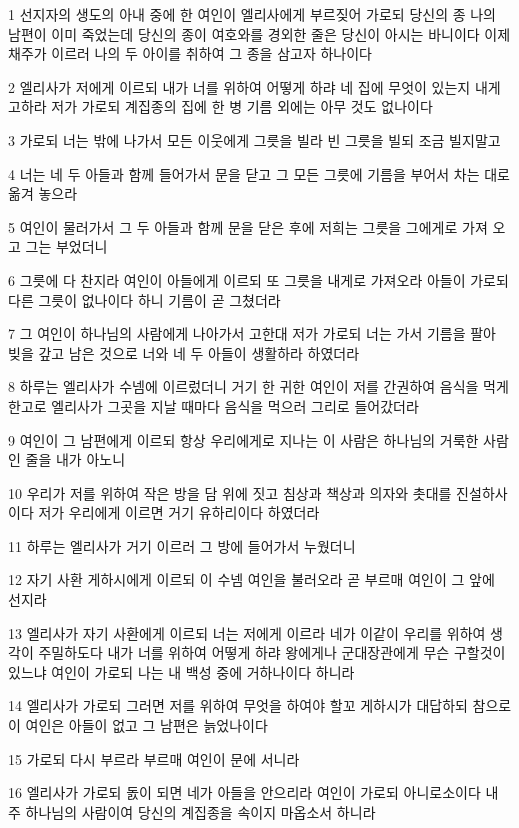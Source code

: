 \par 1 선지자의 생도의 아내 중에 한 여인이 엘리사에게 부르짖어 가로되 당신의 종 나의 남편이 이미 죽었는데 당신의 종이 여호와를 경외한 줄은 당신이 아시는 바니이다 이제 채주가 이르러 나의 두 아이를 취하여 그 종을 삼고자 하나이다
\par 2 엘리사가 저에게 이르되 내가 너를 위하여 어떻게 하랴 네 집에 무엇이 있는지 내게 고하라 저가 가로되 계집종의 집에 한 병 기름 외에는 아무 것도 없나이다
\par 3 가로되 너는 밖에 나가서 모든 이웃에게 그릇을 빌라 빈 그릇을 빌되 조금 빌지말고
\par 4 너는 네 두 아들과 함께 들어가서 문을 닫고 그 모든 그릇에 기름을 부어서 차는 대로 옮겨 놓으라
\par 5 여인이 물러가서 그 두 아들과 함께 문을 닫은 후에 저희는 그릇을 그에게로 가져 오고 그는 부었더니
\par 6 그릇에 다 찬지라 여인이 아들에게 이르되 또 그릇을 내게로 가져오라 아들이 가로되 다른 그릇이 없나이다 하니 기름이 곧 그쳤더라
\par 7 그 여인이 하나님의 사람에게 나아가서 고한대 저가 가로되 너는 가서 기름을 팔아 빚을 갚고 남은 것으로 너와 네 두 아들이 생활하라 하였더라
\par 8 하루는 엘리사가 수넴에 이르렀더니 거기 한 귀한 여인이 저를 간권하여 음식을 먹게 한고로 엘리사가 그곳을 지날 때마다 음식을 먹으러 그리로 들어갔더라
\par 9 여인이 그 남편에게 이르되 항상 우리에게로 지나는 이 사람은 하나님의 거룩한 사람인 줄을 내가 아노니
\par 10 우리가 저를 위하여 작은 방을 담 위에 짓고 침상과 책상과 의자와 촛대를 진설하사이다 저가 우리에게 이르면 거기 유하리이다 하였더라
\par 11 하루는 엘리사가 거기 이르러 그 방에 들어가서 누웠더니
\par 12 자기 사환 게하시에게 이르되 이 수넴 여인을 불러오라 곧 부르매 여인이 그 앞에 선지라
\par 13 엘리사가 자기 사환에게 이르되 너는 저에게 이르라 네가 이같이 우리를 위하여 생각이 주밀하도다 내가 너를 위하여 어떻게 하랴 왕에게나 군대장관에게 무슨 구할것이 있느냐 여인이 가로되 나는 내 백성 중에 거하나이다 하니라
\par 14 엘리사가 가로되 그러면 저를 위하여 무엇을 하여야 할꼬 게하시가 대답하되 참으로 이 여인은 아들이 없고 그 남편은 늙었나이다
\par 15 가로되 다시 부르라 부르매 여인이 문에 서니라
\par 16 엘리사가 가로되 돐이 되면 네가 아들을 안으리라 여인이 가로되 아니로소이다 내 주 하나님의 사람이여 당신의 계집종을 속이지 마옵소서 하니라
